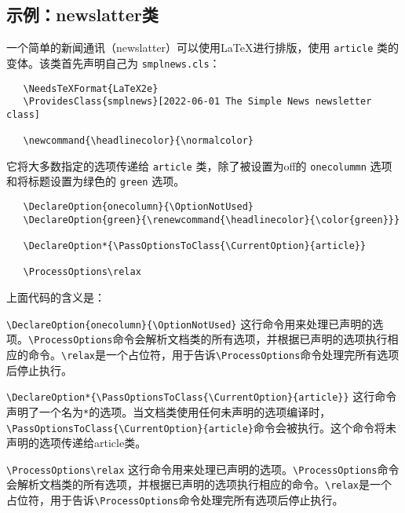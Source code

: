 \documentclass[12pt]{ltxguide}
\begin{document}
\subsection{示例：newslatter类}
一个简单的新闻通讯（newslatter）可以使用\LaTeX{}进行排版，使用 \verb|article| 类的变体。该类首先声明自己为 \verb|smplnews.cls|：
\begin{verbatim}
   \NeedsTeXFormat{LaTeX2e}
   \ProvidesClass{smplnews}[2022-06-01 The Simple News newsletter class]

   \newcommand{\headlinecolor}{\normalcolor}
\end{verbatim}
它将大多数指定的选项传递给 \verb|article| 类，除了被设置为off的 \verb|onecolummn| 选项和将标题设置为绿色的 \verb|green| 选项。
\begin{verbatim}
   \DeclareOption{onecolumn}{\OptionNotUsed}
   \DeclareOption{green}{\renewcommand{\headlinecolor}{\color{green}}}

   \DeclareOption*{\PassOptionsToClass{\CurrentOption}{article}}

   \ProcessOptions\relax
\end{verbatim}
上面代码的含义是：
\begin{compactenum}
  \item \verb|\DeclareOption{onecolumn}{\OptionNotUsed}| 这行命令用来处理已声明的选项。\verb|\ProcessOptions|命令会解析文档类的所有选项，并根据已声明的选项执行相应的命令。\verb|\relax|是一个占位符，用于告诉\verb|\ProcessOptions|命令处理完所有选项后停止执行。
  \item \verb|\DeclareOption*{\PassOptionsToClass{\CurrentOption}{article}}| 这行命令声明了一个名为\verb|*|的选项。当文档类使用任何未声明的选项编译时，\\ \verb|\PassOptionsToClass{\CurrentOption}{article}|命令会被执行。这个命令将未声明的选项传递给article类。
  \item \verb|\ProcessOptions\relax| 这行命令用来处理已声明的选项。\verb|\ProcessOptions|命令会解析文档类的所有选项，并根据已声明的选项执行相应的命令。\verb|\relax|是一个占位符，用于告诉\verb|\ProcessOptions|命令处理完所有选项后停止执行。
\end{compactenum}
\end{document}
